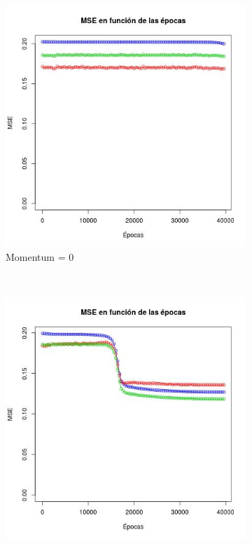 \documentclass[12pt, a4paper]{article}
\begin{document}
\begin{figure}
    \centering

    \begin{subfigure}[b]{0.45\textwidth}
        \includegraphics[width=\textwidth]{mse13d}
        \caption{Momentum = 0}
    \end{subfigure}
      ~ %
    \begin{subfigure}[b]{0.45\textwidth}
        \includegraphics[width=\textwidth]{mse13c}

\end{subfigure}
\end{figure}
\end{document}
